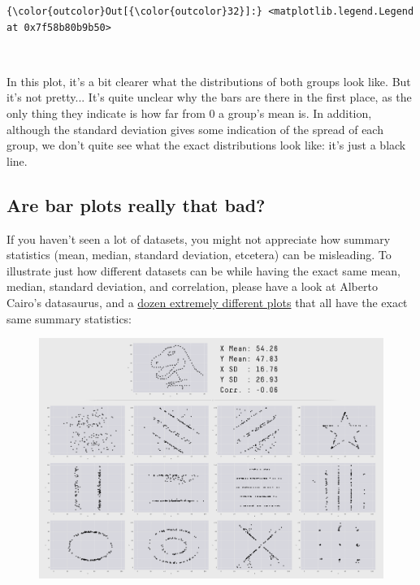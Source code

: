 \documentclass[11pt]{article}
\makeatletter
\def\maxwidth{\ifdim\Gin@nat@width>\linewidth\linewidth
    \else\Gin@nat@width\fi}
\let\Oldincludegraphics\includegraphics
\renewcommand{\includegraphics}[1]{\Oldincludegraphics[width=.8\maxwidth]{#1}}
\makeatother
\begin{document}
\begin{Verbatim}[commandchars=\\\{\}]
{\color{outcolor}Out[{\color{outcolor}32}]:} <matplotlib.legend.Legend at 0x7f58b80b9b50>
\end{Verbatim}
            
    \begin{center}
    \end{center}
    { \hspace*{\fill} \\}
    
    In this plot, it's a bit clearer what the distributions of both groups
look like. But it's not pretty... It's quite unclear why the bars are
there in the first place, as the only thing they indicate is how far
from 0 a group's mean is. In addition, although the standard deviation
gives some indication of the spread of each group, we don't quite see
what the exact distributions look like: it's just a black line.

    \subsection{Are bar plots really that
bad?}\label{are-bar-plots-really-that-bad}

If you haven't seen a lot of datasets, you might not appreciate how
summary statistics (mean, median, standard deviation, etcetera) can be
misleading. To illustrate just how different datasets can be while
having the exact same mean, median, standard deviation, and correlation,
please have a look at Alberto Cairo's datasaurus, and a
\href{https://www.autodeskresearch.com/publications/samestats}{dozen
extremely different plots} that all have the exact same summary
statistics:

\begin{figure}[htbp]
\centering
\includegraphics{datasaurus_alberto_cairo.png}
\caption{}
\end{figure}
\end{document}
